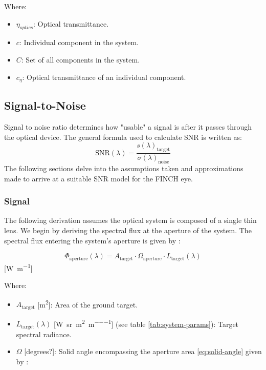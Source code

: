 \documentclass{article}
\begin{document}
Where:
\begin{itemize}[label={}]
    \item $\eta_{optics}$: Optical transmittance.
    \item $c$: Individual component in the system.
    \item $C$: Set of all components in the system.
    \item $c_{\eta}$: Optical transmittance of an individual component.
\end{itemize}

\subsection{Signal-to-Noise}
Signal to noise ratio determines how "usable" a signal is after it passes through the optical device. The general formula used to calculate SNR is written as:
\begin{equation}
\text{SNR}(\lambda) = \frac{s(\lambda)_{\text{target}}}{\sigma(\lambda)_{\text{noise}}}
\end{equation} 
The following sections delve into the assumptions taken and approximations made to arrive at a suitable SNR model for the FINCH eye.

\subsubsection{Signal}

The following derivation assumes the optical system is composed of a single thin lens. We begin by deriving the spectral flux at the aperture of the system. The spectral flux entering the system's aperture is given by \cite{Fiete2001-kz}:

\begin{equation} \label{eq:flux-aperture}
    \Phi_{\text{aperture}}(\lambda) = A_{\text{target}} \cdot \Omega_{\text{aperture}} \cdot L_{\text{target}}(\lambda)
\end{equation}
[\si{\watt\per\meter}]


Where:
\begin{itemize}[label={}]
    \item $A_{\text{target}}$ [\si{\meter\squared}]: Area of the ground target.
    \item $L_{\text{target}}(\lambda)$ [\si{\watt\per\steradian\per\meter\squared\per\meter}] (see table \ref{tab:system-params}): Target spectral radiance.
    \item $\Omega$ [degrees?]: Solid angle encompassing the aperture area \eqref{eq:solid-angle} given by \cite{Fiete2001-kz}: 
\end{itemize}
\end{document}
